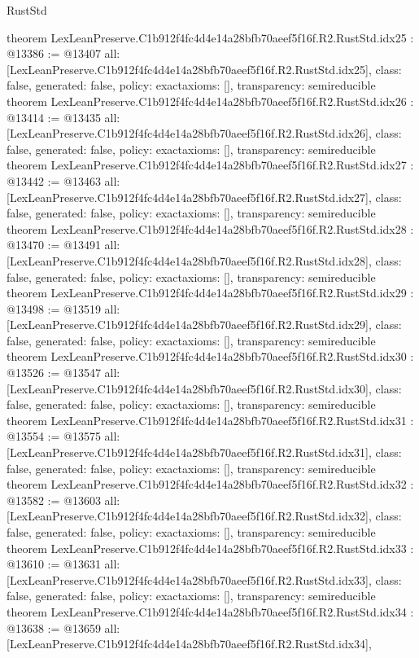 \begin{lexlean}{RustStd}
\begin{coremodule}
{}
theorem LexLeanPreserve.C1b912f4fc4d4e14a28bfb70aeef5f16f.R2.RustStd.idx25 : @13386 := @13407 {
  all: [LexLeanPreserve.C1b912f4fc4d4e14a28bfb70aeef5f16f.R2.RustStd.idx25],
  class: false,
  generated: false,
  policy: exact{axioms: []},
  transparency: semireducible
}
theorem LexLeanPreserve.C1b912f4fc4d4e14a28bfb70aeef5f16f.R2.RustStd.idx26 : @13414 := @13435 {
  all: [LexLeanPreserve.C1b912f4fc4d4e14a28bfb70aeef5f16f.R2.RustStd.idx26],
  class: false,
  generated: false,
  policy: exact{axioms: []},
  transparency: semireducible
}
theorem LexLeanPreserve.C1b912f4fc4d4e14a28bfb70aeef5f16f.R2.RustStd.idx27 : @13442 := @13463 {
  all: [LexLeanPreserve.C1b912f4fc4d4e14a28bfb70aeef5f16f.R2.RustStd.idx27],
  class: false,
  generated: false,
  policy: exact{axioms: []},
  transparency: semireducible
}
theorem LexLeanPreserve.C1b912f4fc4d4e14a28bfb70aeef5f16f.R2.RustStd.idx28 : @13470 := @13491 {
  all: [LexLeanPreserve.C1b912f4fc4d4e14a28bfb70aeef5f16f.R2.RustStd.idx28],
  class: false,
  generated: false,
  policy: exact{axioms: []},
  transparency: semireducible
}
theorem LexLeanPreserve.C1b912f4fc4d4e14a28bfb70aeef5f16f.R2.RustStd.idx29 : @13498 := @13519 {
  all: [LexLeanPreserve.C1b912f4fc4d4e14a28bfb70aeef5f16f.R2.RustStd.idx29],
  class: false,
  generated: false,
  policy: exact{axioms: []},
  transparency: semireducible
}
theorem LexLeanPreserve.C1b912f4fc4d4e14a28bfb70aeef5f16f.R2.RustStd.idx30 : @13526 := @13547 {
  all: [LexLeanPreserve.C1b912f4fc4d4e14a28bfb70aeef5f16f.R2.RustStd.idx30],
  class: false,
  generated: false,
  policy: exact{axioms: []},
  transparency: semireducible
}
theorem LexLeanPreserve.C1b912f4fc4d4e14a28bfb70aeef5f16f.R2.RustStd.idx31 : @13554 := @13575 {
  all: [LexLeanPreserve.C1b912f4fc4d4e14a28bfb70aeef5f16f.R2.RustStd.idx31],
  class: false,
  generated: false,
  policy: exact{axioms: []},
  transparency: semireducible
}
theorem LexLeanPreserve.C1b912f4fc4d4e14a28bfb70aeef5f16f.R2.RustStd.idx32 : @13582 := @13603 {
  all: [LexLeanPreserve.C1b912f4fc4d4e14a28bfb70aeef5f16f.R2.RustStd.idx32],
  class: false,
  generated: false,
  policy: exact{axioms: []},
  transparency: semireducible
}
theorem LexLeanPreserve.C1b912f4fc4d4e14a28bfb70aeef5f16f.R2.RustStd.idx33 : @13610 := @13631 {
  all: [LexLeanPreserve.C1b912f4fc4d4e14a28bfb70aeef5f16f.R2.RustStd.idx33],
  class: false,
  generated: false,
  policy: exact{axioms: []},
  transparency: semireducible
}
theorem LexLeanPreserve.C1b912f4fc4d4e14a28bfb70aeef5f16f.R2.RustStd.idx34 : @13638 := @13659 {
  all: [LexLeanPreserve.C1b912f4fc4d4e14a28bfb70aeef5f16f.R2.RustStd.idx34],
}
\end{coremodule}
\end{lexlean}

